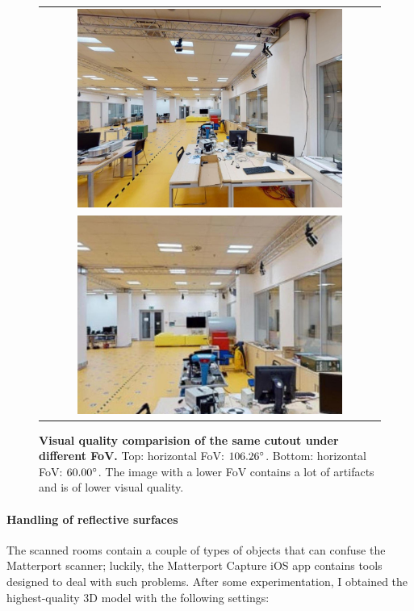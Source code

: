 \documentclass[twoside]{ctuthesis}
\theoremstyle{plain}
\theoremstyle{definition}
\theoremstyle{note}
\begin{document}
\begin{figure}
    \centering
    {
    \begin{tabular}{c}
    \includegraphics[width=0.8\textwidth]{cutout_19_-90_0_FoV106} \\
    \includegraphics[width=0.8\textwidth]{cutout_19_-90_0_FoV60}
    \end{tabular}
	\caption[FOV quality comparison]{{\bf Visual quality comparision of the same cutout under different FoV.} Top: horizontal FoV: $106.26\degree$. Bottom: horizontal FoV: $60.00\degree$. The image with a lower FoV contains a lot of artifacts and is of lower visual quality.}
	\label{fig:fov-quality}
    }
\end{figure}

\paragraph{Handling of reflective surfaces}
The scanned rooms contain a couple of types of objects that can confuse the Matterport scanner; luckily, the Matterport Capture iOS app contains tools designed to deal with such problems. After some experimentation, I obtained the highest-quality 3D model with the following settings:
\end{document}
